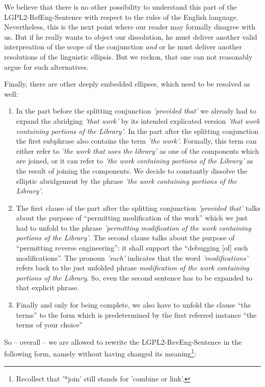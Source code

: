 We believe that there is no other possibility to understand this part of the 
LGPL2-RefEng-Sentence with respect to the rules of the English language.
Nevertheless, this is the next point where our reader may formally disagree
with us. But if he really wants to object our dissolution, he must deliver
another valid interpreation of the scope of the conjunction \emph{and} or he
must deliver another resolutions of the linguistic ellipsis. But we reckon, that
one can not reasonably argue for such alternatives.

Finally, there are other deeply embedded ellipses, which need to be resolved
as well:

\begin{enumerate}
  \item  In the part before the splitting conjunction \emph{'provided that'} we
  already had to expand the abridging \emph{'that work'} by its intended
  explicated version \emph{'that work containing portions of the Library'}.  In
  the part after the splitting conjunction the first subphrase also contains the
  term \emph{'the work'}. Formally, this term can either refer to \emph{'the
  work that uses the library'} as one of the components which are joined, or it
  can refer to \emph{'the work containing portions of the Library'} as the
  result of joining the components. We decide to constantly dissolve the
  elliptic abridgement by the phrase \emph{'the work containing portions of the
  Library'}.
  \item The first clause of the part after the splitting conjunction
  \emph{'provided that'} talks about the purpose of \enquote{permitting
  modification of the work} which we just had to unfold to the phrase
  \emph{'permitting modification of the work containing portions of the
  Library'}. The second clause talks about the purpose of \enquote{permitting
  reverse engineering}: it shall support the \enquote{debugging [of] such
  modifications}. The pronoun \emph{'such'} indicates that the word
  \emph{'modifications'} refers back to the just unfolded phrase
  \emph{modification of the work containing portions of the Library}. So, even
  the second sentence has to be expanded to that explicit phrase.
  \item Finally and only for being complete, we also have to unfold the clause
  \enquote{the terms} to the form which is predetermined by the first referred
  instance \enquote{the terms of your choice}
\end{enumerate}

So -- overall -- we are allowed to rewrite the LGPL2-RevEng-Sentence 
in the following form, namely without having changed its
meaning\footnote{Recollect that '*join' still stands for 'combine or link'.}:

